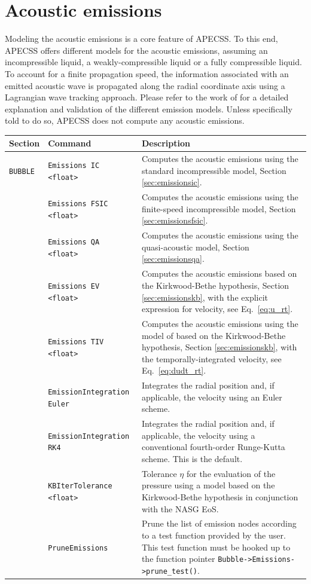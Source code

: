 \chapter{Acoustic emissions}

Modeling the acoustic emissions is a core feature of APECSS. To this end, APECSS offers different models for the acoustic emissions, assuming an incompressible liquid, a weakly-compressible liquid or a fully compressible liquid. To account for a finite propagation speed, the information associated with an emitted acoustic wave is propagated along the radial coordinate axis using a Lagrangian wave tracking approach. Please refer to the work of \citet{Denner2023} for a detailed explanation and validation of the different emission models. Unless specifically told to do so, APECSS does not compute any acoustic emissions. 

\vspace{0.8em}

\noindent
\begin{tabular}{p{} p{} p{}}
    \textbf{Section} &\textbf{Command} & \textbf{Description} 
\vspace{1mm} \\ \hline
{\tt BUBBLE} & {\tt Emissions IC <float>} & Computes the acoustic emissions using the standard incompressible model, Section \ref{sec:emissionsic}.\\ 
& {\tt Emissions FSIC <float>} & Computes the acoustic emissions using the finite-speed incompressible model, Section \ref{sec:emissionsfsic}.\\ 
& {\tt Emissions QA <float>} & Computes the acoustic emissions using the quasi-acoustic model, Section \ref{sec:emissionsqa}.\\ 
& {\tt Emissions EV <float>} & Computes the acoustic emissions based on the Kirkwood-Bethe hypothesis, Section \ref{sec:emissionskb}, with the explicit expression for velocity, see Eq.~\eqref{eq:u_rt}.\\ 
& {\tt Emissions TIV <float>} & Computes the acoustic emissions using the model of \citet{Hickling1963} based on the Kirkwood-Bethe hypothesis, Section \ref{sec:emissionskb}, with the temporally-integrated velocity, see Eq.~\eqref{eq:dudt_rt}.\\ 
& {\tt EmissionIntegration Euler} & Integrates the radial position and, if applicable, the velocity using an Euler scheme.\\
& {\tt EmissionIntegration RK4} & Integrates the radial position and, if applicable, the velocity using a conventional fourth-order Runge-Kutta scheme. This is the default.\\
& {\tt KBIterTolerance <float>} & Tolerance $\eta$ for the evaluation of the pressure using a model based on the Kirkwood-Bethe hypothesis in conjunction with the NASG EoS.\\
& {\tt PruneEmissions} & Prune the list of emission nodes according to a test function provided by the user. This test function must  be hooked up to the function pointer {\tt Bubble->Emissions->prune\_test()}.\\
 \hline
\end{tabular} \vspace{0.2em}

